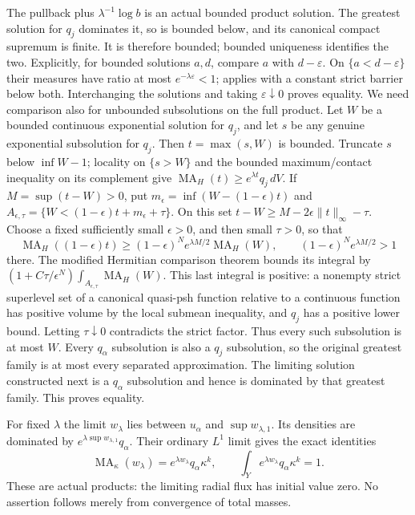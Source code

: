 \documentclass[11pt]{article}
\newcommand{\MA}{\operatorname{MA}}
\theoremstyle{remark}\newtheorem{remark}[theorem]{Remark}
\begin{document}
The pullback plus $\lambda^{-1}\log b$ is an actual bounded product
solution. The greatest solution for $q_j$ dominates it, so is bounded
below, and its canonical compact supremum is finite. It is therefore
bounded; bounded uniqueness identifies the two. Explicitly, for bounded
solutions $a,d$, compare $a$ with $d-\varepsilon$. On
$\{a<d-\varepsilon\}$ their measures have ratio at most
$e^{-\lambda\varepsilon}<1$; \cite[Lemma 4.2]{BGL} applies with a constant
strict barrier below both. Interchanging the solutions and taking
$\varepsilon\downarrow0$ proves equality.
We need comparison also for unbounded subsolutions on the full product.
Let $W$ be a bounded continuous exponential solution for $q_j$, and
let $s$ be any genuine exponential subsolution for $q_j$.
Then $t=\max(s,W)$ is bounded. Truncate $s$ below
$\inf W-1$; locality on $\{s>W\}$ and the bounded maximum/contact
inequality \cite[Lemma 1.2]{GL} on its complement give
$\MA_H(t)\geq e^{\lambda t}q_j\,dV$.
If $M=\sup(t-W)>0$, put
$m_\epsilon=\inf(W-(1-\epsilon)t)$ and
$A_{\epsilon,\tau}=\{W<(1-\epsilon)t+m_\epsilon+\tau\}$.
On this set $t-W\geq M-2\epsilon\|t\|_\infty-\tau$.
Choose a fixed sufficiently small $\epsilon>0$, and then small $\tau>0$,
so that
\[
 \MA_H((1-\epsilon)t)\geq
 (1-\epsilon)^N e^{\lambda M/2}\MA_H(W),\qquad
 (1-\epsilon)^N e^{\lambda M/2}>1
\]
there. The modified Hermitian comparison theorem
\cite[Theorem 0.2]{KN} bounds its integral by
$(1+C\tau/\epsilon^N)\int_{A_{\epsilon,\tau}}\MA_H(W)$.
This last integral is positive: a nonempty strict superlevel set of a
canonical quasi-psh function relative to a continuous function has
positive volume by the local submean inequality, and $q_j$ has a
positive lower bound. Letting $\tau\downarrow0$ contradicts the strict
factor. Thus every such subsolution is at most $W$.
Every $q_\alpha$ subsolution is also a $q_j$ subsolution, so the original
greatest family is at most every separated approximation. The limiting
solution constructed next is a $q_\alpha$ subsolution and hence is
dominated by that greatest family. This proves equality.

For fixed $\lambda$ the limit $w_\lambda$ lies between $u_\alpha$ and
$\sup w_{\lambda,1}$. Its densities are dominated by
$e^{\lambda\sup w_{\lambda,1}}q_\alpha$. Their ordinary $L^1$ limit gives
the exact identities
\begin{equation}\label{eq:base}
 \MA_\kappa(w_\lambda)=e^{\lambda w_\lambda}q_\alpha\kappa^k,\qquad
 \int_Ye^{\lambda w_\lambda}q_\alpha\kappa^k=1.
\end{equation}
These are actual products: the limiting radial flux has initial value
zero. No assertion follows merely from convergence of total masses.
\end{document}
